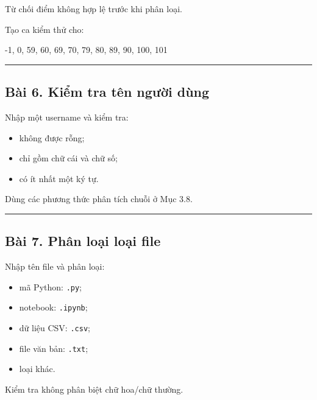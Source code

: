 \documentclass[
  11pt,
  a4paper,
]{article}
\newenvironment{Shaded}{}{}
\newcommand{\NormalTok}[1]{#1}
\providecommand{\tightlist}{%
  \setlength{\itemsep}{0pt}\setlength{\parskip}{0pt}}
\begin{document}
Từ chối điểm không hợp lệ trước khi phân loại.

Tạo ca kiểm thử cho:

\begin{Shaded}
\begin{Highlighting}[]
\NormalTok{{-}1, 0, 59, 60, 69, 70, 79, 80, 89, 90, 100, 101}
\end{Highlighting}
\end{Shaded}

\begin{center}\rule{0.5\linewidth}{0.5pt}\end{center}

\subsection{Bài 6. Kiểm tra tên người
dùng}\label{buxe0i-6.-kiux1ec3m-tra-tuxean-ngux1b0ux1eddi-duxf9ng}

Nhập một username và kiểm tra:

\begin{itemize}
\tightlist
\item
  không được rỗng;
\item
  chỉ gồm chữ cái và chữ số;
\item
  có ít nhất một ký tự.
\end{itemize}

Dùng các phương thức phân tích chuỗi ở Mục 3.8.

\begin{center}\rule{0.5\linewidth}{0.5pt}\end{center}

\subsection{Bài 7. Phân loại loại
file}\label{buxe0i-7.-phuxe2n-loux1ea1i-loux1ea1i-file}

Nhập tên file và phân loại:

\begin{itemize}
\tightlist
\item
  mã Python: \texttt{.py};
\item
  notebook: \texttt{.ipynb};
\item
  dữ liệu CSV: \texttt{.csv};
\item
  file văn bản: \texttt{.txt};
\item
  loại khác.
\end{itemize}

Kiểm tra không phân biệt chữ hoa/chữ thường.
\end{document}
